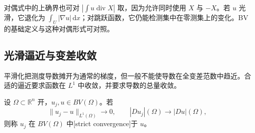 \ProseParagraphBreak
对偶式中的上确界也可对 \(\left|\int u\operatorname{div}X\right|\) 取，因为允许同时使用 \(X\) 与 \(-X\)。若 \(u\) 光滑，它退化为 \(\int_U|\nabla u|\,\mathrm dx\)；对跳跃函数，它仍能检测集中在零测集上的变化。BV 的基础定义与这种对偶形式可对照\cite[第6节，式6.1，第35页]{Simon1983}。

\subsection{光滑逼近与变差收敛}
\label{g3:subsec:2101:03}
平滑化把测度导数摊开为通常的梯度，但一般不能使导数在全变差范数中趋近。合适的逼近要求函数在 \(L^1\) 中收敛，并要求导数的总量收敛。

\begin{definition}\label{g3:def:bv-strict-convergence}
	设 \(\Omega\subset\mathbb R^n\) 开，\(u_j,u\in BV(\Omega)\)。若
	\[
		\|u_j-u\|_{L^1(\Omega)}\longrightarrow0,\qquad
		|Du_j|(\Omega)\longrightarrow|Du|(\Omega),
	\]
	则称 \(u_j\) 在 \(BV(\Omega)\) 中[strict convergence]于 \(u\)。
\end{definition}

